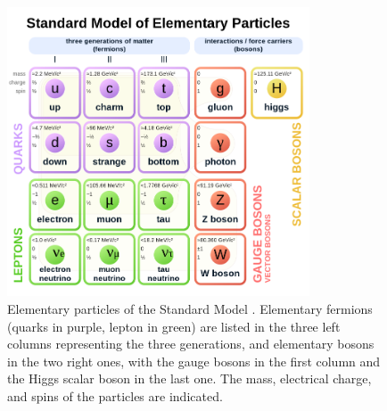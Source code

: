 \begin{figure}[!h]
    \centering
    \includegraphics[width=0.8\textwidth]{Images/Theory/particlesSM.png} %
    \caption[Particles in the SM]{Elementary particles of the Standard Model \cite{tableSMWiki}. Elementary fermions (quarks in purple, lepton in green) are listed in the three left columns representing the three generations, and elementary bosons in the two right ones, with the gauge bosons in the first column and the Higgs scalar boson in the last one. The mass, electrical charge, and spins of the particles are indicated.}
    \label{particlesSM}
\end{figure}

